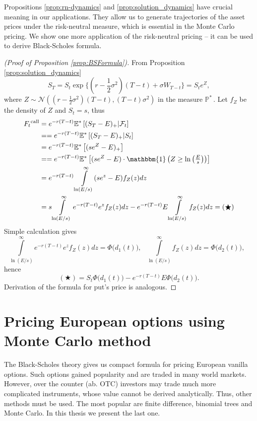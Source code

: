 \documentclass[a4paper,11pt, twoside]{book}
\theoremstyle{definition}
\theoremstyle{remark}
\def\Em{{\mathbb{E}^*}}
\def\Pm{{\mathbb{P}}^*\,}
\begin{document}
Propositions \ref{prop:rn-dynamics} and \ref{prop:solution_dynamics} have crucial meaning in our applications. They allow us to generate trajectories of the asset prices under the risk-neutral measure, which is essential in the Monte Carlo pricing. We show one more application of the risk-neutral pricing -- it can be used to derive Black-Scholes formula.
\begin{proof}[(Proof of Proposition \ref{prop:BSFormula})]
 From Proposition \ref{prop:solution_dynamics}
 \[ S_T = S_t \exp\bigl\{ (r - \frac{1}{2} \sigma^2)(T-t) + \sigma W_{T-t} \bigr\} = S_t e^Z, \]
 where $Z \sim \mathcal{N}\left((r - \frac{1}{2} \sigma^2)(T-t), (T-t)\sigma^2 \right)$ in the measure $\Pm$. Let $f_Z$ be the density of $Z$ and $S_t = s$, thus
 \begin{equation*}
  \begin{split}
    F_t\textsuperscript{call} &= e^{-r(T-t)} \Em\left[(S_T-E)_+ | \mathcal{F}_t \right] \\
    &= = e^{-r(T-t)} \Em\left[(S_T-E)_+ |S_t\right] \\
    &= e^{-r(T-t)} \Em\left[(s e^Z-E)_+ \right] \\
    &= = e^{-r(T-t)} \Em\left[(s e^Z-E) \cdot \mathbbm{1}\left({\textstyle Z \geq \ln\left(\frac{E}{s}\right)} \right) \right] \\
    &= e^{-r(T-t)} \int\limits_{\ln(E/s)}^\infty (se^z - E)f_Z(z) dz \\
    &= s\int\limits_{\ln(E/s)}^\infty e^{-r(T-t)}e^z f_Z(z) dz - e^{-r(T-t)} E\int\limits_{\ln(E/s)}^\infty f_Z(z) dz = (\bigstar)
  \end{split}
 \end{equation*}
 Simple calculation gives
 \[ \int\limits_{\ln(E/s)}^\infty e^{-r(T-t)}e^z f_Z(z) dz = \Phi\bigl( d_1(t) \bigr),  \ \ \ 
    \int\limits_{\ln(E/s)}^\infty f_Z(z) dz = \Phi\bigl( d_2(t) \bigr),  \ \ \ \]
 hence 
 \[ (\bigstar) = S_t \Phi\bigl( d_1(t) \bigr)  - e^{-r(T-t)} E \Phi\bigl( d_2(t) \bigr) . \]
 Derivation of the formula for put's price is analogous.
\end{proof}




\chapter[{Pricing European options using Monte Carlo method}]{Pricing European options using \\Monte Carlo method}
\label{chapter:European}
The Black-Scholes theory gives us compact formula for pricing European vanilla options. Such options gained popularity and are traded in many world markets. However, over the counter (ab. OTC) investors may trade much more complicated instruments, whose value cannot be derived analytically. Thus, other methods must be used.
The most popular are finite difference, binomial trees and Monte Carlo. In this thesis we present the last one.
\end{document}
